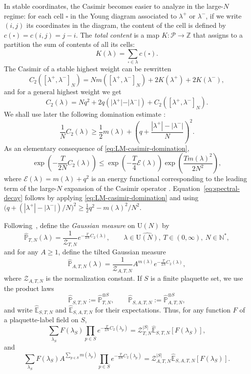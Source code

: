 \documentclass[11pt,a4paper,reqno]{amsart}
\theoremstyle{definition}
\theoremstyle{remark}
\newcommand\U{{\mathrm U}}
\newcommand\Z{{\mathbb{Z}}}
\newcommand\N{{\mathbb N}}
\newcommand\E{{\mathbb E}}
\newcommand\Pfr{{\mathcal{P}}}
\newcommand\Pbb{{\mathbb{P}}}
\begin{document}
In stable coordinates, the Casimir becomes easier to analyze in the large-$N$ regime: for each cell $\square$ in the Young diagram associated to $\lambda^+$ or $\lambda^-$, if we write $(i,j)$ its coordinates in the diagram, the content of the cell is defined by $c(\square)=c(i,j)=j-i.$ The \emph{total content} is a map $K:\Pfr\to\Z$ that assigns to a partition the sum of contents of all its cells:
\[
K(\lambda)=\sum_{\square\in\lambda}c(\square).
\]
The Casimir of a stable highest weight can be rewritten
\[
C_2([\lambda^+,\lambda^-]_N)=Nm([\lambda^+,\lambda^-]_N)+2K(\lambda^+)+2K(\lambda^-),
\]
and for a general highest weight we get
\begin{equation}\label{eq:casimir-det-shift}
C_2(\lambda)=Nq^2+2q(\vert\lambda^+\vert-\vert\lambda^-\vert)+C_2([\lambda^+,\lambda^-]_N).
\end{equation}
We shall use later the following domination estimate \cite[Lemma~4.1]{LemMai25}:
\begin{equation}\label{eq:LM-casimir-domination}
\frac{1}{N}C_2(\lambda)\geq \frac12m(\lambda)+\left(q+\frac{|\lambda^+|-|\lambda^-|}{N}\right)^2 .
\end{equation}
As an elementary consequence of \eqref{eq:LM-casimir-domination},
\begin{equation}\label{eq:spectral-decay}
\exp\left(-\frac{T}{2N}C_2(\lambda)\right)\leq \exp\left(-\frac{T}{4}\mathcal E(\lambda)\right)\exp\left(\frac{T m(\lambda)^2}{2N^2}\right),
\end{equation}
where $\mathcal E(\lambda)=m(\lambda)+q^2$ is an energy functional corresponding to the leading term of the large-$N$ expansion of the Casimir operator \cite{LM2}. Equation~\eqref{eq:spectral-decay} follows by applying \eqref{eq:LM-casimir-domination} and using
$\bigl(q+(|\lambda^+|-|\lambda^-|)/N\bigr)^2
\geq \frac12 q^2-m(\lambda)^2/N^2$.

Following~\cite{LemMai25}, define the \emph{Gaussian measure} on $\widehat{\U(N)}$ by
\[
\widehat\Pbb_{T,N}(\lambda)=\frac{1}{\mathcal Z_{T,N}}e^{-\frac{T}{2N}C_2(\lambda)},\qquad \lambda\in\widehat{\U(N)},\ T\in(0,\infty),\ N\in\N^*,
\]
and for any $A\geq 1$, define the tilted Gaussian measure
\[
\widehat\Pbb_{A,T,N}(\lambda)=\frac{1}{\mathcal Z_{A,T,N}}A^{m(\lambda)}e^{-\frac{T}{2N}C_2(\lambda)},
\]
where $\mathcal Z_{A,T,N}$ is the normalization constant.  If $S$ is a finite plaquette set, we use the product laws
\begin{equation}\label{eq:product-ref-laws}
\widehat\Pbb_{S,T,N}:=\widehat\Pbb_{T,N}^{\otimes S},\qquad
\widehat\Pbb_{S,A,T,N}:=\widehat\Pbb_{A,T,N}^{\otimes S},
\end{equation}
and write $\widehat\E_{S,T,N}$ and $\widehat\E_{S,A,T,N}$ for their expectations.  Thus, for any function $F$ of a plaquette-label field on $S$,
\[
\sum_{\lambda_S}F(\lambda_S)\prod_{p\in S}e^{-\frac{T}{2N}C_2(\lambda_p)}=\mathcal Z_{T,N}^{|S|}\widehat\E_{S,T,N}[F(\lambda_S)],
\]
and
\[
\sum_{\lambda_S}F(\lambda_S)A^{\sum_{p\in S}m(\lambda_p)}\prod_{p\in S}e^{-\frac{T}{2N}C_2(\lambda_p)}=\mathcal Z_{A,T,N}^{|S|}\widehat\E_{S,A,T,N}[F(\lambda_S)].
\]
\end{document}
